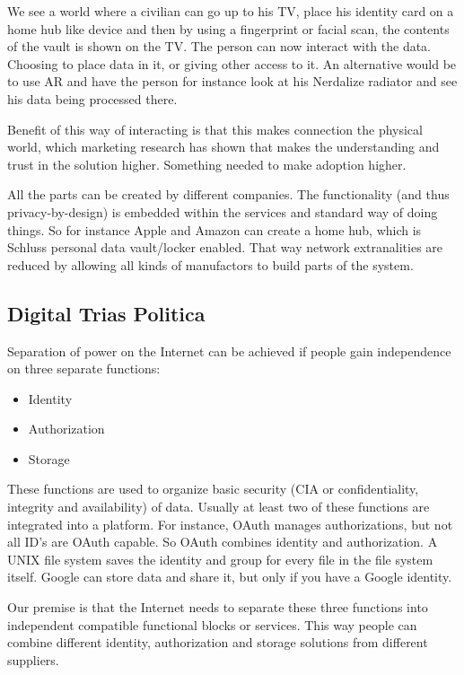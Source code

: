 \documentclass{article}
\begin{document}
We see a world where a civilian can go up to his TV, place his identity card on a home hub like device and then by using a fingerprint or facial scan, the contents of the vault is shown on the TV. The person can now interact with the data. Choosing to place data in it, or giving other access to it. An alternative would be to use AR and have the person for instance look at his Nerdalize radiator and see his data being processed there.

Benefit of this way of interacting is that this makes connection the physical world, which marketing research has shown that makes the understanding and trust in the solution higher. Something needed to make adoption higher.

All the parts can be created by different companies. The functionality (and thus privacy-by-design) is embedded within the services and standard way of doing things. So for instance Apple and Amazon can create a home hub, which is Schluss personal data vault/locker enabled. That way network extranalities are reduced by allowing all kinds of manufactors to build parts of the system.

\subsection{Digital Trias Politica}
Separation of power on the Internet can be achieved if people gain independence on three separate functions:

\begin{itemize}
    \item Identity
    \item Authorization
    \item Storage
\end{itemize}

These functions are used to organize basic security (CIA or confidentiality, integrity and availability) of data. Usually at least two of these functions are integrated into a platform. For instance, OAuth manages authorizations, but not all ID's are OAuth capable. So OAuth combines identity and authorization. A UNIX file system saves the identity and group for every file in the file system itself. Google can store data and share it, but only if you have a Google identity. 

Our premise is that the Internet needs to separate these three functions into independent compatible functional blocks or services. This way people can combine different identity, authorization and storage solutions from different suppliers.
\end{document}
